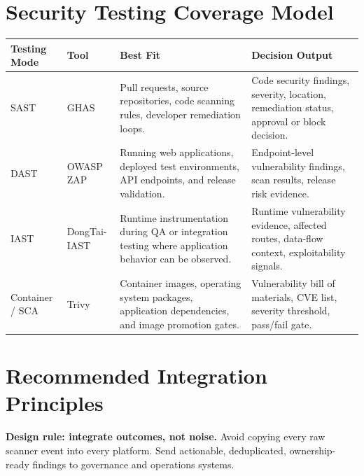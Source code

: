 \documentclass[10pt,letterpaper]{article}
\begin{document}
\section{Security Testing Coverage Model}

\begin{tabularx}{\textwidth}{L{1.35in} L{1.15in} Y Y}
\toprule
\textbf{Testing Mode} & \textbf{Tool} & \textbf{Best Fit} & \textbf{Decision Output} \\
\midrule
SAST & GHAS & Pull requests, source repositories, code scanning rules, developer remediation loops. & Code security findings, severity, location, remediation status, approval or block decision. \\
DAST & OWASP ZAP & Running web applications, deployed test environments, API endpoints, and release validation. & Endpoint-level vulnerability findings, scan results, release risk evidence. \\
IAST & DongTai-IAST & Runtime instrumentation during QA or integration testing where application behavior can be observed. & Runtime vulnerability evidence, affected routes, data-flow context, exploitability signals. \\
Container / SCA & Trivy & Container images, operating system packages, application dependencies, and image promotion gates. & Vulnerability bill of materials, CVE list, severity threshold, pass/fail gate. \\
\bottomrule
\end{tabularx}

\section{Recommended Integration Principles}

\begin{principlebox}
\textbf{Design rule: integrate outcomes, not noise.} Avoid copying every raw scanner event into every platform. Send actionable, deduplicated, ownership-ready findings to governance and operations systems.
\end{principlebox}
\end{document}
